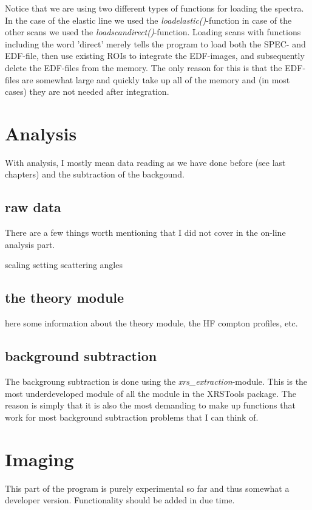 \documentclass[aps,prl,groupedaddress]{revtex4}
\begin{document}
Notice that we are using two different types of functions for loading the spectra. In the case of the elastic line we used the \textit{loadelastic()}-function in case of the other scans we used the \textit{loadscandirect()}-function. Loading scans with functions including the word 'direct' merely tells the program to load both the SPEC- and EDF-file, then use existing ROIs to integrate the EDF-images, and subsequently delete the EDF-files from the memory. The only reason for this is that the EDF-files are somewhat large and quickly take up all of the memory and (in most cases) they are not needed after integration.

\section{Analysis}
With analysis, I mostly mean data reading as we have done before (see last chapters) and the subtraction of the backgound.

\subsection{raw data}
There are a few things worth mentioning that I did not cover in the on-line analysis part. 

scaling
setting scattering angles


\subsection{the theory module}
here some information about the theory module, the HF compton profiles, etc.


\subsection{background subtraction}
The backgroung subtraction is done using the \textit{xrs\_extraction}-module. This is the most underdeveloped module of all the module in the XRSTools package. The reason is simply that it is also the most demanding to make up functions that work for most background subtraction problems that I can think of.


\section{Imaging}
This part of the program is purely experimental so far and thus somewhat a developer version. Functionality should be added in due time.
\end{document}
